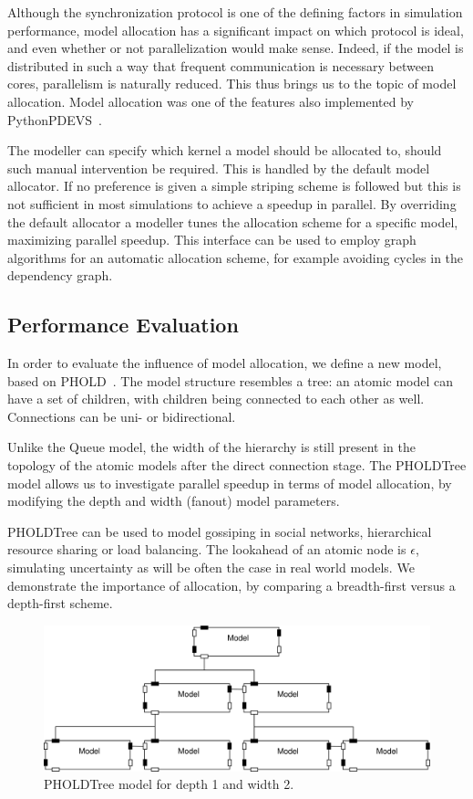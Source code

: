 Although the synchronization protocol is one of the defining factors in simulation performance, model allocation has a significant impact on which protocol is ideal, and even whether or not parallelization would make sense.
Indeed, if the model is distributed in such a way that frequent communication is necessary between cores, parallelism is naturally reduced.
This thus brings us to the topic of model allocation.
Model allocation was one of the features also implemented by PythonPDEVS~\cite{PythonPDEVS2}.

The modeller can specify which kernel a model should be allocated to, should such manual intervention be required.
This is handled by the default model allocator.
If no preference is given a simple striping scheme is followed but this is not sufficient in most simulations to achieve a speedup in parallel.
By overriding the default allocator a modeller tunes the allocation scheme for a specific model, maximizing parallel speedup.
This interface can be used to employ graph algorithms for an automatic allocation scheme, for example avoiding cycles in the dependency graph.

\subsection{Performance Evaluation}
In order to evaluate the influence of model allocation, we define a new model, based on PHOLD~\cite{PHOLD}.
The model structure resembles a tree: an atomic model can have a set of children, with children being connected to each other as well.
Connections can be uni- or bidirectional.

Unlike the Queue model, the width of the hierarchy is still present in the topology of the atomic models after the direct connection stage.
The PHOLDTree model allows us to investigate parallel speedup in terms of model allocation, by modifying the depth and width (fanout) model parameters.

PHOLDTree can be used to model gossiping in social networks, hierarchical resource sharing or load balancing.
The lookahead of an atomic node is $\epsilon$, simulating uncertainty as will be often the case in real world models.
We demonstrate the importance of allocation, by comparing a breadth-first versus a depth-first scheme.

\begin{figure}
\includegraphics[width=\modelfraction\columnwidth]{fig/pholdtree.pdf}
\caption{PHOLDTree model for depth 1 and width 2.}
\label{fig:PHOLDTree_model}
\end{figure}

